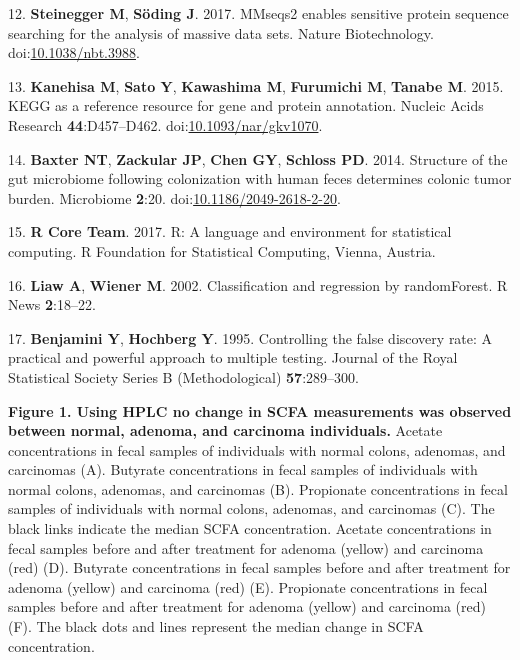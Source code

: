 \documentclass[11pt,]{article}
\begin{document}
\hypertarget{ref-Steinegger2017}{}
12. \textbf{Steinegger M}, \textbf{Söding J}. 2017. MMseqs2 enables
sensitive protein sequence searching for the analysis of massive data
sets. Nature Biotechnology.
doi:\href{https://doi.org/10.1038/nbt.3988}{10.1038/nbt.3988}.

\hypertarget{ref-Kanehisa2015}{}
13. \textbf{Kanehisa M}, \textbf{Sato Y}, \textbf{Kawashima M},
\textbf{Furumichi M}, \textbf{Tanabe M}. 2015. KEGG as a reference
resource for gene and protein annotation. Nucleic Acids Research
\textbf{44}:D457--D462.
doi:\href{https://doi.org/10.1093/nar/gkv1070}{10.1093/nar/gkv1070}.

\hypertarget{ref-scfa_baxter2014}{}
14. \textbf{Baxter NT}, \textbf{Zackular JP}, \textbf{Chen GY},
\textbf{Schloss PD}. 2014. Structure of the gut microbiome following
colonization with human feces determines colonic tumor burden.
Microbiome \textbf{2}:20.
doi:\href{https://doi.org/10.1186/2049-2618-2-20}{10.1186/2049-2618-2-20}.

\hypertarget{ref-r_citation_2017}{}
15. \textbf{R Core Team}. 2017. R: A language and environment for
statistical computing. R Foundation for Statistical Computing, Vienna,
Austria.

\hypertarget{ref-randomforest_citation_2002}{}
16. \textbf{Liaw A}, \textbf{Wiener M}. 2002. Classification and
regression by randomForest. R News \textbf{2}:18--22.

\hypertarget{ref-benjamini_controlling_1995}{}
17. \textbf{Benjamini Y}, \textbf{Hochberg Y}. 1995. Controlling the
false discovery rate: A practical and powerful approach to multiple
testing. Journal of the Royal Statistical Society Series B
(Methodological) \textbf{57}:289--300.

\newpage

\textbf{Figure 1. Using HPLC no change in SCFA measurements was observed
between normal, adenoma, and carcinoma individuals.} Acetate
concentrations in fecal samples of individuals with normal colons,
adenomas, and carcinomas (A). Butyrate concentrations in fecal samples
of individuals with normal colons, adenomas, and carcinomas (B).
Propionate concentrations in fecal samples of individuals with normal
colons, adenomas, and carcinomas (C). The black links indicate the
median SCFA concentration. Acetate concentrations in fecal samples
before and after treatment for adenoma (yellow) and carcinoma (red) (D).
Butyrate concentrations in fecal samples before and after treatment for
adenoma (yellow) and carcinoma (red) (E). Propionate concentrations in
fecal samples before and after treatment for adenoma (yellow) and
carcinoma (red) (F). The black dots and lines represent the median
change in SCFA concentration.
\end{document}
